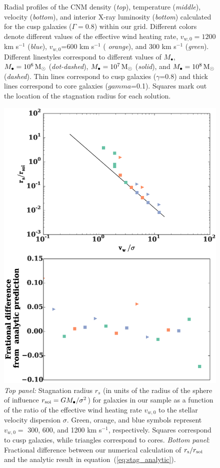 \documentclass[usenatbib,fleqn]{mn2e}
\newcommand{\Mbh}[1][]{M_{\bullet#1}}
\newcommand{\vwO}{v_{w,0}}
\begin{document}
\begin{figure}
  \caption{\label{fig:profiles}Radial profiles of the CNM density
    ({\it top}), temperature ({\it middle}), velocity ({\it bottom}),
    and interior X-ray luminosity ({\it bottom}) calculated for the
    cusp galaxies ($\Gamma=0.8$) within our grid.  Different colors
    denote different values of the effective wind heating rate,
    $\vwO=1200$ km s$^{-1}$ ({\it blue}), $\vwO$=600 km s$^{-1}$ ({\it
      orange}), and 300 km s$^{-1}$ ({\it green}).  Different
    linestyles correspond to different values of $\Mbh$, $\Mbh=10^6
    \Msun$ ({\it dot-dashed}), $\Mbh=10^7 \Msun$ ({\it solid}), and
    $\Mbh=10^8 \Msun$ ({\it dashed}). Thin lines correspond to cusp
    galaxies ($\gamma$=0.8) and thick lines correspond to core
    galaxies ($gamma$=0.1). Squares mark out the location of
    the stagnation radius for each solution.
 }
\end{figure}

\begin{figure}
  \includegraphics[width=\columnwidth]{rs.eps}
  \caption{\label{fig:stag} \emph{Top panel:} Stagnation radius
    $r_{s}$ (in units of the radius of the sphere of influence $r_{\rm
      soi} = GM_{\bullet}/\sigma^{2}$) for galaxies in our sample as a
    function of the ratio of the effective wind heating rate $v_{w,0}$
    to the stellar velocity dispersion $\sigma$.  Green, orange, and
    blue symbols represent $v_{w,0} =$ 300, 600, and 1200 km s$^{-1}$,
    respectively.  Squares correspond to cusp galaxies, while
    triangles correspond to cores. \emph{Bottom panel}: Fractional
    difference between our numerical calculation of $r_{\rm s}/r_{\rm
      soi}$ and the analytic result in
    equation~(\ref{eq:stag_analytic}). }
\end{figure}
\end{document}
